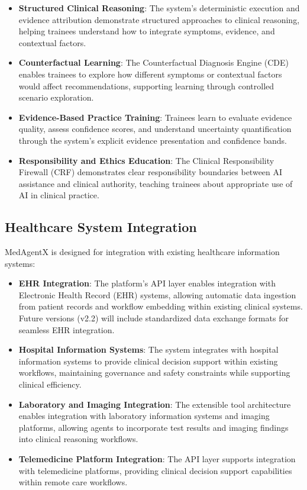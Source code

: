 \documentclass[journal]{IEEEtran}
\begin{document}
\begin{itemize}
    \item \textbf{Structured Clinical Reasoning}: The system's deterministic execution and evidence attribution demonstrate structured approaches to clinical reasoning, helping trainees understand how to integrate symptoms, evidence, and contextual factors.
    \item \textbf{Counterfactual Learning}: The Counterfactual Diagnosis Engine (CDE) enables trainees to explore how different symptoms or contextual factors would affect recommendations, supporting learning through controlled scenario exploration.
    \item \textbf{Evidence-Based Practice Training}: Trainees learn to evaluate evidence quality, assess confidence scores, and understand uncertainty quantification through the system's explicit evidence presentation and confidence bands.
    \item \textbf{Responsibility and Ethics Education}: The Clinical Responsibility Firewall (CRF) demonstrates clear responsibility boundaries between AI assistance and clinical authority, teaching trainees about appropriate use of AI in clinical practice.
\end{itemize}

\subsection{Healthcare System Integration}

MedAgentX is designed for integration with existing healthcare information systems:

\begin{itemize}
    \item \textbf{EHR Integration}: The platform's API layer enables integration with Electronic Health Record (EHR) systems, allowing automatic data ingestion from patient records and workflow embedding within existing clinical systems. Future versions (v2.2) will include standardized data exchange formats for seamless EHR integration.
    \item \textbf{Hospital Information Systems}: The system integrates with hospital information systems to provide clinical decision support within existing workflows, maintaining governance and safety constraints while supporting clinical efficiency.
    \item \textbf{Laboratory and Imaging Integration}: The extensible tool architecture enables integration with laboratory information systems and imaging platforms, allowing agents to incorporate test results and imaging findings into clinical reasoning workflows.
    \item \textbf{Telemedicine Platform Integration}: The API layer supports integration with telemedicine platforms, providing clinical decision support capabilities within remote care workflows.
\end{itemize}
\end{document}
